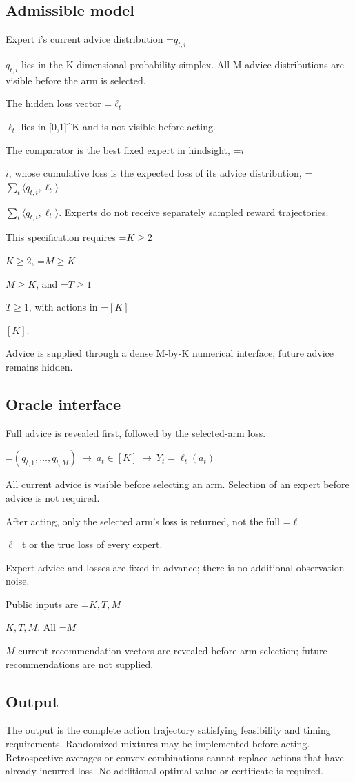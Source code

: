 \documentclass[10pt,a4paper]{article}
\newcommand{\AtlasMath}[1]{\par\begingroup\centering\setbox0=\hbox{$\displaystyle #1$}\ifdim\wd0>1.4\linewidth\typeout{ATLAS WIDE FORMULA: \the\wd0}\fi\ifdim\wd0>\linewidth\resizebox{\linewidth}{!}{\box0}\else\box0\fi\par\endgroup}
\newcommand{\AtlasInlineMath}[1]{\begingroup\setbox0=\hbox{$#1$}\ifdim\wd0>.4\linewidth\endgroup\AtlasMath{#1}\else\endgroup$#1$\fi}
\begin{document}
\subsection{Admissible model}
Expert i’s current advice distribution \AtlasInlineMath{q_{t,i}} lies in the K-dimensional probability simplex. All M advice distributions are visible before the arm is selected.

The hidden loss vector \AtlasInlineMath{\ell_t} lies in [0,1]\textasciicircum{}K and is not visible before acting.

The comparator is the best fixed expert in hindsight, \AtlasInlineMath{i}, whose cumulative loss is the expected loss of its advice distribution, \AtlasInlineMath{\sum_t\langle q_{t,i},\ell_t\rangle}. Experts do not receive separately sampled reward trajectories.

This specification requires \AtlasInlineMath{K\ge2}, \AtlasInlineMath{M\ge K}, and \AtlasInlineMath{T\ge1}, with actions in \AtlasInlineMath{[K]}.

Advice is supplied through a dense M-by-K numerical interface; future advice remains hidden.

\subsection{Oracle interface}
Full advice is revealed first, followed by the selected-arm loss.


\AtlasMath{(q_{t,1},\ldots,q_{t,M})\ \longrightarrow\ a_t\in[K]\ \longmapsto\ Y_t=\ell_t(a_t)}


All current advice is visible before selecting an arm. Selection of an expert before advice is not required.

After acting, only the selected arm's loss is returned, not the full \AtlasInlineMath{\ell}\_t or the true loss of every expert.

Expert advice and losses are fixed in advance; there is no additional observation noise.

Public inputs are \AtlasInlineMath{K,T,M}. All \AtlasInlineMath{M} current recommendation vectors are revealed before arm selection; future recommendations are not supplied.

\subsection{Output}
The output is the complete action trajectory satisfying feasibility and timing requirements. Randomized mixtures may be implemented before acting. Retrospective averages or convex combinations cannot replace actions that have already incurred loss. No additional optimal value or certificate is required.
\end{document}
